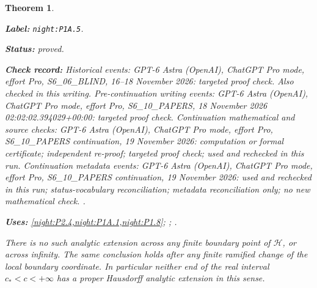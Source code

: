 \documentclass[11pt,a4paper]{article}
\newtheorem{theorem}{Theorem}[section]
\theoremstyle{definition}
\newcommand{\StatementRecord}[4]{\par\smallskip\begingroup\upshape\raggedright\noindent\textbf{Label:} \nolinkurl{#1}.\par\noindent\textbf{Status:} #2.\par\noindent\textbf{Check record:} #3.\par\noindent\textbf{Uses:} #4.\par\endgroup\smallskip}
\begin{document}
\begin{theorem}\label{night:P1A.5}
\StatementRecord{night:P1A.5}{proved}{Historical events: GPT-6 Astra (OpenAI), ChatGPT Pro mode, effort Pro, S6\_06\_BLIND, 16--18 November 2026: targeted proof check. Also checked in this writing. Pre-continuation writing events: GPT-6 Astra (OpenAI), ChatGPT Pro mode, effort Pro, S6\_10\_PAPERS, 18 November 2026 02:02:02.394029+00:00: targeted proof check. Continuation mathematical and source checks: GPT-6 Astra (OpenAI), ChatGPT Pro mode, effort Pro, S6\_10\_PAPERS continuation, 19 November 2026: computation or formal certificate; independent re-proof; targeted proof check; used and rechecked in this run. Continuation metadata events: GPT-6 Astra (OpenAI), ChatGPT Pro mode, effort Pro, S6\_10\_PAPERS continuation, 19 November 2026: used and rechecked in this run; status-vocabulary reconciliation; metadata reconciliation only; no new mathematical check. }{\cref{night:P2.4,night:P1A.1,night:P1.8}; \cite[Theorem 1.6, preprint p.~5]{BM97}; \cite[\S6, Hauptsatz I; \S7, Satz 1 and Satz 5]{Grauert60}}
There is no such analytic extension across any finite boundary
point of $\mathcal H$, or across infinity. The same conclusion
holds after any finite ramified change of the local boundary
coordinate. In particular neither end of the real interval
$c_*<c<+\infty$ has a proper Hausdorff analytic extension in
this sense.
\end{theorem}
\end{document}
